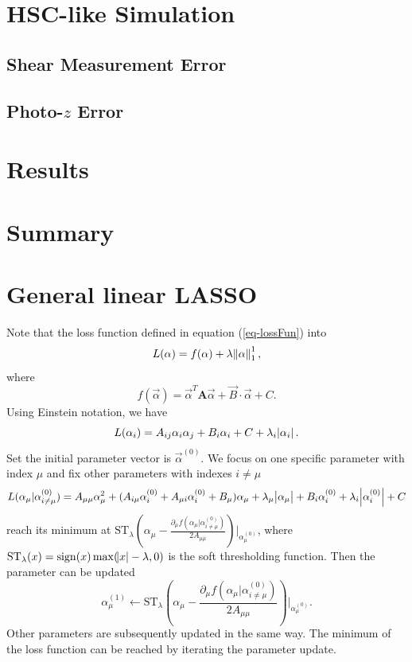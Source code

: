 \documentclass[twocolumn]{aastex62}
\begin{document}
\section{HSC-like Simulation}


\subsection{Shear Measurement Error}
\subsection{Photo-$z$ Error}




\section{Results}


\section{Summary}




\appendix
\section{General linear LASSO}
Note that the loss function defined in equation (\ref{eq-lossFun}) into
\begin{equation}
L(\alpha)=f(\alpha) +\lambda \norm{\alpha}^1_1,
\end{equation}
where
\begin{equation}
f(\vec{\alpha}) = \vec{\alpha}^T \mathbf{A} \vec{\alpha} + \vec{B} \cdot \vec{\alpha} +C.
\end{equation}
Using Einstein notation, we have
\begin{equation}
L(\alpha_i) = A_{ij} \alpha_i \alpha_j + B_{i} \alpha_i + C +\lambda_i \abs{\alpha_i}.
\end{equation}
Set the initial parameter vector is $\vec{\alpha}^{(0)}$. We focus on one specific parameter with index $\mu$ and fix other parameters with indexes $i \neq \mu$
\begin{equation}
L(\alpha_\mu| \alpha^{(0)}_{i\neq\mu})=A_{\mu\mu} \alpha_\mu^2 + (A_{i\mu}\alpha^{(0)}_i+A_{\mu i}\alpha^{(0)}_i +B_\mu) \alpha_\mu +\lambda_\mu \abs{\alpha_\mu} +B_i \alpha^{(0)}_i + \lambda_i \abs{\alpha^{(0)}_i} +C
\end{equation}
reach its minimum at $\mathrm{ST}_{\lambda} (\alpha_\mu -\frac{\partial_\mu f(\alpha_\mu| \alpha^{(0)}_{i\neq\mu})}{2A_{\mu\mu}}) |_{\alpha_\mu^{(0)}}$,
where $\mathrm{ST}_{\lambda} (x) = \mathrm{sign} (x) \max (\abs{x}-\lambda,0)$ is the soft thresholding function. Then the parameter can be updated
\begin{equation}
\alpha^{(1)}_\mu \leftarrow \mathrm{ST}_{\lambda} (\alpha_\mu -\frac{\partial_\mu f(\alpha_\mu| \alpha^{(0)}_{i\neq\mu})}{2A_{\mu\mu}}) |_{\alpha_\mu^{(0)}}.
\end{equation}
Other parameters are subsequently updated in the same way. The minimum of the loss function can be reached by iterating the parameter update.
\end{document}
